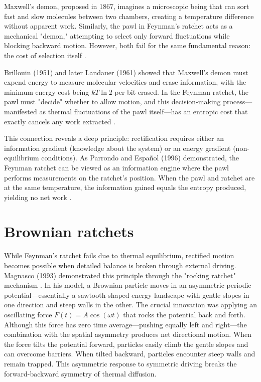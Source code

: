 Maxwell's demon, proposed in 1867, imagines a microscopic being that can sort fast and slow molecules between two chambers, creating a temperature difference without apparent work. Similarly, the pawl in Feynman's ratchet acts as a mechanical "demon," attempting to select only forward fluctuations while blocking backward motion. However, both fail for the same fundamental reason: the cost of selection itself \cite{maxwell1871theory, maxwell1867letter}.

Brillouin (1951) and later Landauer (1961) showed that Maxwell's demon must expend energy to measure molecular velocities and erase information, with the minimum energy cost being $kT\ln{2}$ per bit erased. In the Feynman ratchet, the pawl must "decide" whether to allow motion, and this decision-making process—manifested as thermal fluctuations of the pawl itself—has an entropic cost that exactly cancels any work extracted \cite{brillouin1951maxwell, landauer1961irreversibility}.

This connection reveals a deep principle: rectification requires either an information gradient (knowledge about the system) or an energy gradient (non-equilibrium conditions). As Parrondo and Español (1996) demonstrated, the Feynman ratchet can be viewed as an information engine where the pawl performs measurements on the ratchet's position. When the pawl and ratchet are at the same temperature, the information gained equals the entropy produced, yielding no net work \cite{parrondo1996criticism}.


\section{Brownian ratchets}
\label{sct:brownianratchets}

While Feynman's ratchet fails due to thermal equilibrium, rectified motion becomes possible when detailed balance is broken through external driving. Magnasco (1993) demonstrated this principle through the "rocking ratchet" mechanism \cite{magnasco1993forced}. In his model, a Brownian particle moves in an asymmetric periodic potential—essentially a sawtooth-shaped energy landscape with gentle slopes in one direction and steep walls in the other.
The crucial innovation was applying an oscillating force $F(t) = A\cos(\omega t)$ that rocks the potential back and forth. Although this force has zero time average—pushing equally left and right—the combination with the spatial asymmetry produces net directional motion. When the force tilts the potential forward, particles easily climb the gentle slopes and can overcome barriers. When tilted backward, particles encounter steep walls and remain trapped. This asymmetric response to symmetric driving breaks the forward-backward symmetry of thermal diffusion.


